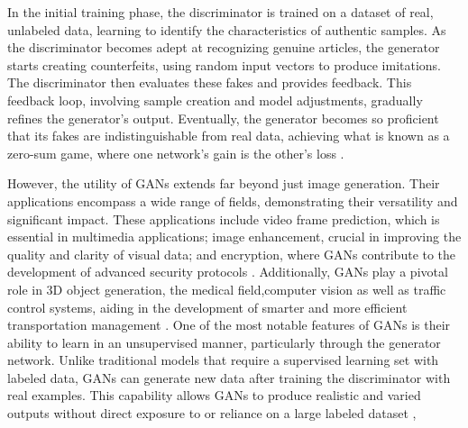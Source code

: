 In the initial training phase, the discriminator is trained on a dataset of real, unlabeled data, learning to identify the characteristics of authentic samples. As the discriminator becomes adept at recognizing genuine articles, the generator starts creating counterfeits, using random input vectors to produce imitations. The discriminator then evaluates these fakes and provides feedback. This feedback loop, involving sample creation and model adjustments, gradually refines the generator's output. Eventually, the generator becomes so proficient that its fakes are indistinguishable from real data, achieving what is known as a zero-sum game, where one network's gain is the other's loss \citep{goodfellowGAN}.

However, the utility of GANs extends far beyond just image generation. Their applications encompass a wide range of fields, demonstrating their versatility and significant impact. These applications include video frame prediction, which is essential in multimedia applications; image enhancement, crucial in improving the quality and clarity of visual data; and encryption, where GANs contribute to the development of advanced security protocols \citep{goodfellowGAN}. Additionally, GANs play a pivotal role in 3D object generation, the medical field,computer vision as well as traffic control systems, aiding in the development of smarter and more efficient transportation management \citep{AGGARWAL2021100004}. One of the most notable features of GANs is their ability to learn in an unsupervised manner, particularly through the generator network. Unlike traditional models that require a supervised learning set with labeled data, GANs can generate new data after training the discriminator with real examples. This capability allows GANs to produce realistic and varied outputs without direct exposure to or reliance on a large labeled dataset \citep{GoodfellowDeepLearning},

